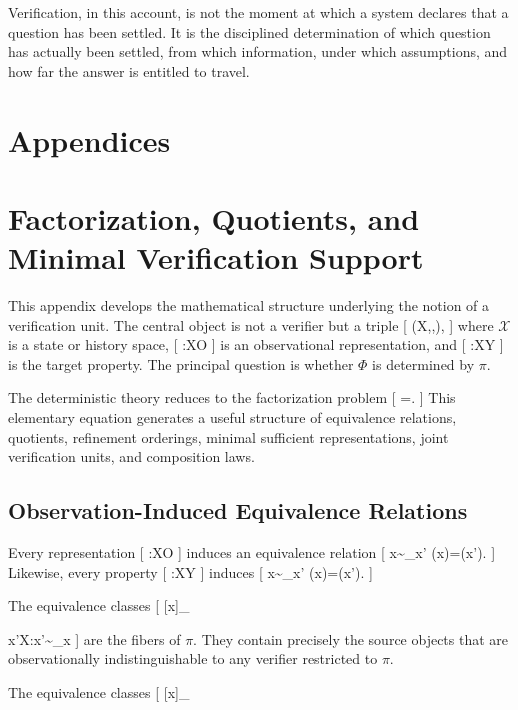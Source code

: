 \documentclass[11pt]{article}
\begin{document}
Verification, in this account, is not the moment at which a system declares that a question has been settled. It is the disciplined determination of which question has actually been settled, from which information, under which assumptions, and how far the answer is entitled to travel.


\newpage 
\section*{Appendices}

\appendix

\section{Factorization, Quotients, and Minimal Verification Support}
\label{app:factorization}

This appendix develops the mathematical structure underlying the notion of a verification unit. The central object is not a verifier but a triple
[
(\mathcal X,\pi,\Phi),
]
where $\mathcal X$ is a state or history space,
[
\pi:\mathcal X\to\mathcal O
]
is an observational representation, and
[
\Phi:\mathcal X\to\mathcal Y
]
is the target property. The principal question is whether $\Phi$ is determined by $\pi$.

The deterministic theory reduces to the factorization problem
[
\Phi=\widehat{\Phi}\circ\pi.
]
This elementary equation generates a useful structure of equivalence relations, quotients, refinement orderings, minimal sufficient representations, joint verification units, and composition laws.

\subsection{Observation-Induced Equivalence Relations}

Every representation
[
\pi:\mathcal X\to\mathcal O
]
induces an equivalence relation
[
x\sim_\pi x'
\quad\Longleftrightarrow\quad
\pi(x)=\pi(x').
]
Likewise, every property
[
\Phi:\mathcal X\to\mathcal Y
]
induces
[
x\sim_\Phi x'
\quad\Longleftrightarrow\quad
\Phi(x)=\Phi(x').
]

The equivalence classes
[
[x]_\pi

{x'\in\mathcal X:x'\sim_\pi x}
]
are the fibers of $\pi$. They contain precisely the source objects that are observationally indistinguishable to any verifier restricted to $\pi$.

The equivalence classes
[
[x]_\Phi
\end{document}
